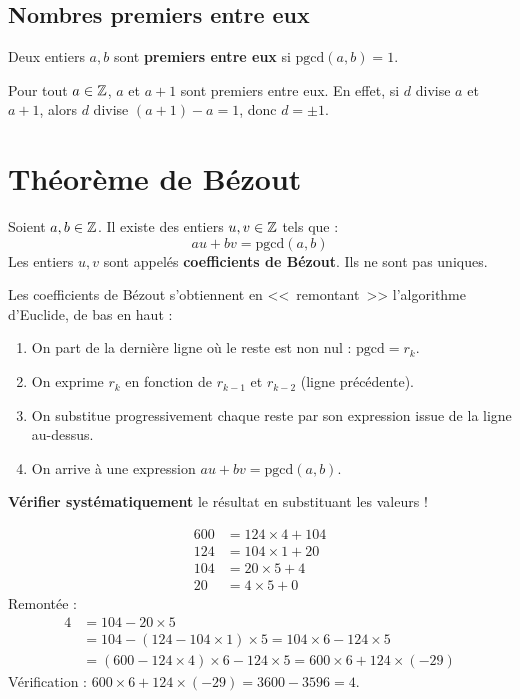 \subsection{Nombres premiers entre eux}

\begin{defbox}
Deux entiers $a, b$ sont \textbf{premiers entre eux} si $\text{pgcd}(a, b) = 1$.
\end{defbox}

\begin{exbox}
Pour tout $a \in \mathbb{Z}$, $a$ et $a + 1$ sont premiers entre eux. En effet, si $d$ divise $a$ et $a+1$, alors $d$ divise $(a+1) - a = 1$, donc $d = \pm 1$.
\end{exbox}


\section{Théorème de Bézout}

\begin{thmbox}
Soient $a, b \in \mathbb{Z}$. Il existe des entiers $u, v \in \mathbb{Z}$ tels que :
\[
  au + bv = \text{pgcd}(a, b)
\]
Les entiers $u, v$ sont appelés \textbf{coefficients de Bézout}. Ils ne sont pas uniques.
\end{thmbox}

\begin{methodbox}
Les coefficients de Bézout s'obtiennent en <<~remontant~>> l'algorithme d'Euclide, de bas en haut :
\begin{enumerate}[leftmargin=1.5cm]
  \item On part de la dernière ligne où le reste est non nul : $\text{pgcd} = r_k$.
  \item On exprime $r_k$ en fonction de $r_{k-1}$ et $r_{k-2}$ (ligne précédente).
  \item On substitue progressivement chaque reste par son expression issue de la ligne au-dessus.
  \item On arrive à une expression $au + bv = \text{pgcd}(a,b)$.
\end{enumerate}
\textbf{Vérifier systématiquement} le résultat en substituant les valeurs !
\end{methodbox}

\begin{exbox}[Coefficients de Bézout pour $\text{pgcd}(600, 124) = 4$]
\begin{align*}
  600 &= 124 \times 4 + 104 \\
  124 &= 104 \times 1 + 20 \\
  104 &= 20 \times 5 + 4 \\
  20 &= 4 \times 5 + 0
\end{align*}
Remontée :
\begin{align*}
  4 &= 104 - 20 \times 5 \\
    &= 104 - (124 - 104 \times 1) \times 5 = 104 \times 6 - 124 \times 5 \\
    &= (600 - 124 \times 4) \times 6 - 124 \times 5 = 600 \times 6 + 124 \times (-29)
\end{align*}
Vérification : $600 \times 6 + 124 \times (-29) = 3600 - 3596 = 4$. \checkmark
\end{exbox}

